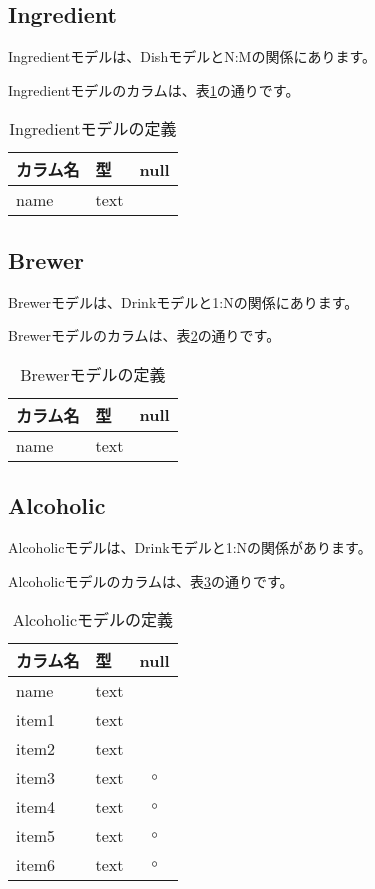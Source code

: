 \documentclass[a4j,titlepage]{jarticle}
\begin{document}
\subsection{Ingredient}
Ingredientモデルは、DishモデルとN:Mの関係にあります。

Ingredientモデルのカラムは、表\ref{ingredient}の通りです。

\begin{table}[!htbp]
\caption{Ingredientモデルの定義}
\label{ingredient}
\small
\begin{center}
\begin{tabular}{|l|l|c|}\hline
カラム名 & 型 & null \\\hline\hline
name & text & \\\hline
\end{tabular}
\end{center}
\end{table}

\subsection{Brewer}
Brewerモデルは、Drinkモデルと1:Nの関係にあります。

Brewerモデルのカラムは、表\ref{brewer}の通りです。

\begin{table}[!htbp]
\caption{Brewerモデルの定義}
\label{brewer}
\small
\begin{center}
\begin{tabular}{|l|l|c|}\hline
カラム名 & 型 & null \\\hline\hline
name & text & \\\hline
\end{tabular}
\end{center}
\end{table}

\subsection{Alcoholic}
Alcoholicモデルは、Drinkモデルと1:Nの関係があります。

Alcoholicモデルのカラムは、表\ref{alcoholic}の通りです。

\begin{table}[!htbp]
\caption{Alcoholicモデルの定義}
\label{alcoholic}
\small
\begin{center}
\begin{tabular}{|l|l|c|}\hline
カラム名 & 型 & null \\\hline\hline
name & text &  \\\hline
item1 & text & \\\hline
item2 & text & \\\hline
item3 & text & $\circ$ \\\hline
item4 & text & $\circ$ \\\hline
item5 & text & $\circ$ \\\hline
item6 & text & $\circ$ \\\hline
\end{tabular}
\end{center}
\end{table}
\end{document}
